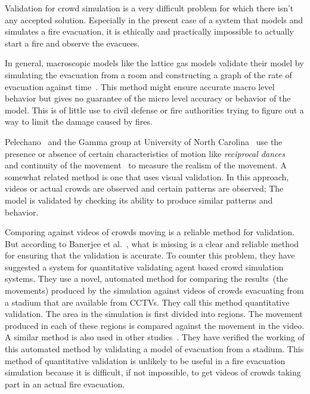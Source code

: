 Validation for crowd simulation is a very difficult problem for which there isn't any accepted solution. Especially in the present case of a system that models and simulates a fire evacuation, it is ethically and practically impossible to actually start a fire and observe the evacuees.

In general, macroscopic models like the lattice gas models validate their model by simulating the evacuation from a room and constructing a graph of the rate of evacuation against time~\cite{Nagai:2004kl}. This method might ensure accurate macro level behavior but gives no guarantee of the micro level accuracy or behavior of the model. This is of little use to civil defense or fire authorities trying to figure out a way to limit the damage caused by fires.

Pelechano~\cite{Pelechano:2008uo} and the Gamma group at University of North Carolina~\cite{Snape:2009er,Guy:2010ko,vandenBerg:2008cq} use the presence or absence of certain characteristics of motion like \emph{reciprocal dances}~\cite{Snape:2009er,vandenBerg:2008cq} and continuity of the movement~\cite{Pelechano:2008uo} to measure the realism of the movement. A somewhat related method is one that uses visual validation. In this approach, videos or actual crowds are observed and certain patterns are observed; The model is validated by checking its ability to produce similar patterns and behavior.

Comparing against videos of crowds moving is a reliable method for validation. But according to Banerjee et al.~\cite{Banerjee:2011uz}, what is missing is a clear and reliable method for ensuring that the validation is accurate. To counter this problem, they have suggested a system for quantitative validating agent based crowd simulation systems. They use a novel, automated method for comparing the results~(the movements) produced by the simulation against videos of crowds evacuating from a stadium that are available from CCTVs. They call this method quantitative validation. The area in the simulation is first divided into regions. The movement produced in each of these regions is compared against the movement in the video. A similar method is also used in other studies~\cite{Lerner:2009wj,Lerner:2010cu}. They have verified the working of this automated method by validating a model of evacuation from a stadium. This method of quantitative validation is unlikely to be useful in a fire evacuation simulation because it is difficult, if not impossible, to get videos of crowds taking part in an actual fire evacuation.

